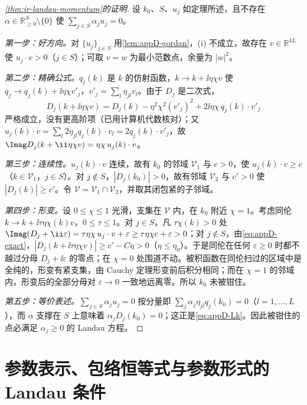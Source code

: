 \begin{proof}[\cref{thm:ir-landau-momentum}的证明]
设 $k_0$、$S$、$u_j$ 如定理所述，且不存在 $\alpha\in\mathbb R^S_{\ge0}\setminus\{0\}$ 使 $\sum_{j\in S}\alpha_ju_j=0$。

\emph{第一步：好方向。}对 $\{u_j\}_{j\in S}$ 用\cref{lem:appD-gordan}，(i) 不成立，故存在 $v\in\mathbb R^{4L}$ 使 $u_j\cdot v>0$（$j\in S$）；可取 $v=w$ 为最小范数点，余量为 $|w|^2$。

\emph{第二步：精确公式。}$q_j(k)$ 是 $k$ 的仿射函数，$k\to k+\ii\eta\chi v$ 使 $q_j\to q_j(k)+\ii\eta\chi v'_j$，$v'_j=\sum_l\eta_{jl}v_l$。由于 $D_j$ 是二次式，
\begin{equation}\label{eq:appD-exact}
D_j(k+\ii\eta\chi v)=D_j(k)-\eta^2\chi^2(v'_j)^2+2\ii\eta\chi\,q_j(k)\cdot v'_j
\end{equation}
严格成立，没有更高阶项（已用计算机代数核对）；又 $u_j(k)\cdot v=\sum_l2\eta_{jl}q_j(k)\cdot v_l=2q_j(k)\cdot v'_j$，故 $\Imag D_j(k+\ii\eta\chi v)=\eta\chi\,u_j(k)\cdot v$。

\emph{第三步：连续性。}$u_j(k)\cdot v$ 连续，故有 $k_0$ 的邻域 $\mathcal V_1$ 与 $c>0$，使 $u_j(k)\cdot v\ge c$（$k\in\mathcal V_1$，$j\in S$）。对 $j\notin S$，$|D_j(k_0)|>0$，故有邻域 $\mathcal V_2$ 与 $c'>0$ 使 $|D_j(k)|\ge c'$。令 $\mathcal V=\mathcal V_1\cap\mathcal V_2$，并取其闭包紧的子邻域。

\emph{第四步：形变。}设 $0\le\chi\le1$ 光滑，支集在 $\mathcal V$ 内，在 $k_0$ 附近 $\chi=1$。考虑同伦 $k\to k+\ii\tau\eta\chi(k)v$，$0\le\tau\le1$。对 $j\in S$，凡 $\tau\chi(k)>0$ 处 $\Imag(D_j+\ii\varepsilon)=\tau\eta\chi\,u_j\cdot v+\varepsilon\ge\tau\eta\chi c+\varepsilon>0$；对 $j\notin S$，由\cref{eq:appD-exact}，$|D_j(k+\ii\tau\eta\chi v)|\ge c'-C\eta>0$（$\eta\le\eta_0$）。于是同伦在任何 $\varepsilon\ge0$ 时都不越过分母 $D_j+\ii\varepsilon$ 的零点；在 $\chi=0$ 处围道不动。被积函数在同伦扫过的区域中是全纯的，形变有紧支集，由 Cauchy 定理形变前后积分相同；而在 $\chi=1$ 的邻域内，形变后的全部分母对 $\varepsilon\to0$ 一致地远离零。所以 $k_0$ 未被钳住。

\emph{第五步：等价表述。}$\sum_{j\in S}\alpha_ju_j=0$ 按分量即 $\sum_j\alpha_j\eta_{jl}q_j(k_0)=0$（$l=1,\dots,L$），而 $\alpha$ 支撑在 $S$ 上意味着 $\alpha_jD_j(k_0)=0$；这正是\cref{eq:appD-Lk}。因此被钳住的点必满足 $\alpha_j\ge0$ 的 Landau 方程。
\end{proof}

\section{参数表示、包络恒等式与参数形式的 Landau 条件}\label{sec:appD-alpha}

